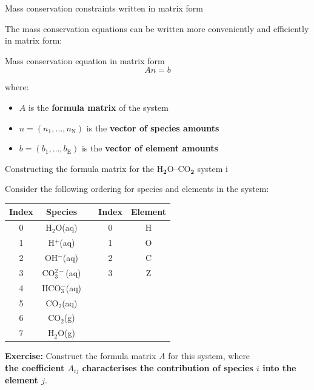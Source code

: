 \begin{frame}{Mass conservation constraints written in matrix form}

The mass conservation equations can be written more conveniently and
efficiently in matrix form:\begin{cbox}{Mass conservation equation in matrix form}{\Large{}
\[
An=b
\]
}\end{cbox}where:
\begin{itemize}
\item $A$ is the \textbf{formula matrix} of the system
\item $n=(n_{1},\ldots,n_{\text{N}})$ is the \textbf{vector of species
amounts}
\item $b=(b_{1},\ldots,b_{\text{E}})$ is the \textbf{vector of element
amounts}
\end{itemize}
\end{frame}
%
%
\begin{frame}[<+->]{Constructing the formula matrix for the H$_{\boldsymbol{2}}$O–CO$_{\boldsymbol{2}}$ system\; i}

Consider the following ordering for species and elements in the system:
\begin{center}
\begin{tabular*}{1\textwidth}{@{\extracolsep{\fill}}ccccc}
\toprule 
\textbf{Index} & \textbf{Species} &  & \textbf{Index} & \textbf{Element}\tabularnewline
\midrule
0 & H$_{2}$O(aq) &  & 0 & H\tabularnewline
1 & H$^{+}$(aq) &  & 1 & O\tabularnewline
2 & OH$^{-}$(aq) &  & 2 & C\tabularnewline
3 & CO$_{3}^{2-}$(aq) &  & 3 & Z\tabularnewline
4 & HCO$_{3}^{-}$(aq) &  &  & \tabularnewline
5 & CO$_{2}$(aq) &  &  & \tabularnewline
6 & CO$_{2}$(g) &  &  & \tabularnewline
7 & H$_{2}$O(g) &  &  & \tabularnewline
\bottomrule
\end{tabular*}
\par\end{center}

\alert{\textbf{Exercise:}} Construct the formula matrix $A$ for this system, where \\
\alert{\textbf{the coefficient $A_{ij}$ characterises the contribution of species 
$i$ into the element $j$}}. 
\end{frame}
%
